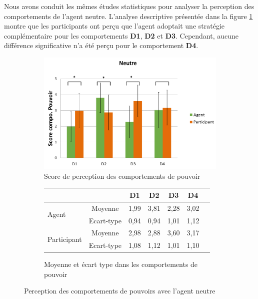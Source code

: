 		Nous avons conduit les mêmes études statistiques pour analyser la perception des comportements de l'agent neutre. L'analyse descriptive présentée dans la figure \ref{fig:neutre} montre que les participants ont perçu que l'agent adoptait une stratégie complémentaire pour les comportements \textbf{D1}, \textbf{D2} et \textbf{D3}. Cependant, aucune différence significative n'a été perçu pour le comportement \textbf{D4}.
		
			\begin{figure}[h]
			\centering
			\begin{subfigure}[b]{0.8\textwidth}
				\centering
				\includegraphics[clip=false]{Figures/chap7/neutrePow.PNG}
				\caption{Score de perception des comportements de pouvoir}
			\end{subfigure}
			
			\begin{subfigure}[b]{0.8\textwidth}
				\centering
				\begin{tabular}{l c c c c c c}
					\hline\hline
					\multicolumn{2}{c}{} & \textbf{D1} & \textbf{D2} & \textbf{D3} & \textbf{D4} \\
					\hline
					
					\multirow{2}{*}{Agent }& Moyenne & 1,99 & 3,81 & 2,28 & 3,02 \\
					& Ecart-type & 0,94 & 0,94 & 1,01 & 1,12 \\
					
					\hline
					\multirow{2}{*}{Participant }& Moyenne & 2,98 & 2,88 & 3,60 & 3,17 \\
					 
					& Ecart-type & 1,08 & 1,12 & 1,01 & 1,10 \\
					\hline \hline
					
				\end{tabular}
				\caption{Moyenne et écart type dans les comportements de pouvoir}
			\end{subfigure}
			\caption{Perception des comportements de pouvoirs avec l'agent neutre}
			\label{fig:neutre}
		\end{figure}
		
